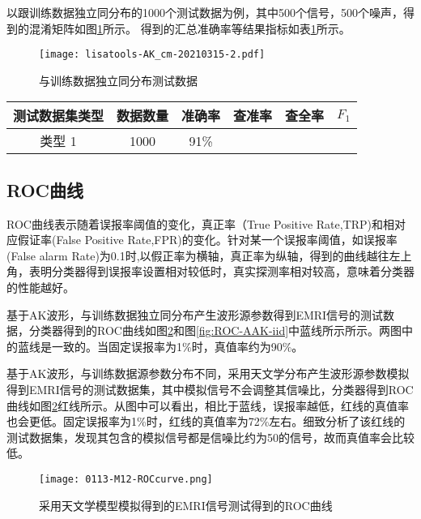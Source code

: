 以跟训练数据独立同分布的1000个测试数据为例，其中500个信号，500个噪声，得到的混淆矩阵如图\ref{fig:cm-iid}所示。%
得到的汇总准确率等结果指标如表\ref{tab:acc}所示。
\begin{figure}[!htbp]
 \centering
 \texttt{[image: lisatools-AK\_cm-20210315-2.pdf]}%
    \caption{\label{fig:cm-iid}与训练数据独立同分布测试数据}
\end{figure}

\begin{table}[!htbp]
\centering
\wuhao
\begin{tabular}{|c|c|c|c|c|c|}
\hline
测试数据集类型&数据数量&准确率&查准率&查全率&$F_1$\\
\hline
类型 1&1000&91\%& & &\\
\hline
\end{tabular}
\label{tab:acc}
\end{table}

\subsection{ROC曲线}
ROC曲线表示随着误报率阈值的变化，真正率（True Positive Rate,TRP)和相对应假证率(False Positive Rate,FPR)的变化。针对某一个误报率阈值，如误报率(False alarm Rate)为0.1时,以假正率为横轴，真正率为纵轴，得到的曲线越往左上角，表明分类器得到误报率设置相对较低时，真实探测率相对较高，意味着分类器的性能越好。

基于AK波形，与训练数据独立同分布产生波形源参数得到EMRI信号的测试数据，分类器得到的ROC曲线如图\ref{fig:ROC-astro}和图\ref{fig:ROC-AAK-iid}中蓝线所示所示。两图中的蓝线是一致的。当固定误报率为1\%时，真值率约为90\%。

基于AK波形，与训练数据源参数分布不同，采用天文学分布产生波形源参数模拟得到EMRI信号的测试数据集，其中模拟信号不会调整其信噪比，分类器得到ROC曲线如图\ref{fig:ROC-astro}红线所示。从图中可以看出，相比于蓝线，误报率越低，红线的真值率也会更低。固定误报率为1\%时，红线的真值率为72\%左右。细致分析了该红线的测试数据集，发现其包含的模拟信号都是信噪比约为50的信号，故而真值率会比较低。

\begin{figure}[!htbp]
 \centering
 \texttt{[image: 0113-M12-ROCcurve.png]}
    \caption{\label{fig:ROC-astro}采用天文学模型模拟得到的EMRI信号测试得到的ROC曲线}
\end{figure}


